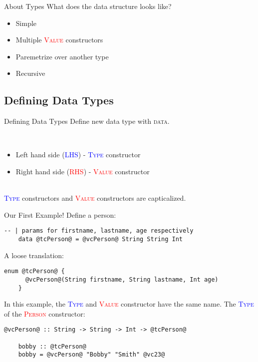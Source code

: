 \documentclass[xcolor={usenames,dvipsnames}]{beamer}
\newcommand{\hkeyword}[1]{\textcolor{TealBlue}{\textsc{#1}}}
\newcommand{\htycon}[1]{\textcolor{Blue}{\textsc{#1}}}
\newcommand{\hvalcon}[1]{\textcolor{Red}{\textsc{#1}}}
\begin{document}
\begin{frame}[fragile]{About Types}
  What does the data structure looks like?
  \pause
  \begin{itemize}
    \item Simple
    \pause
    \item Multiple \hvalcon{Value} constructors
    \pause
    \item Paremetrize over another type
    \pause
    \item Recursive
  \end{itemize}
\end{frame}

\subsection{Defining Data Types}
\begin{frame}[fragile]{Defining Data Types}
  Define new data type with \hkeyword{data}.

  \pause
  \ \\
  \begin{itemize}
    \item Left hand side (\htycon{LHS}) - \htycon{Type} constructor
    \item Right hand side (\hvalcon{RHS}) - \hvalcon{Value} constructor
  \end{itemize}

  \pause
  \ \\
  \htycon{Type} constructors and \hvalcon{Value} constructors are capticalized.
\end{frame}

\begin{frame}[fragile]{Our First Example!}
  Define a person:
  \begin{lstlisting}[style=hask]
    -- | params for firstname, lastname, age respectively
    data @tcPerson@ = @vcPerson@ String String Int
  \end{lstlisting}

  \pause
  A loose translation:
  \begin{lstlisting}[style=hask]
    enum @tcPerson@ {
      @vcPerson@(String firstname, String lastname, Int age)
    }
  \end{lstlisting}

  \pause
  In this example, the \htycon{Type} and \hvalcon{Value} constructor have the same name. The \htycon{Type} of the \hvalcon{Person} constructor:
  \begin{lstlisting}[style=hask]
    @vcPerson@ :: String -> String -> Int -> @tcPerson@

    bobby :: @tcPerson@
    bobby = @vcPerson@ "Bobby" "Smith" @vc23@
  \end{lstlisting}
\end{frame}
\end{document}

